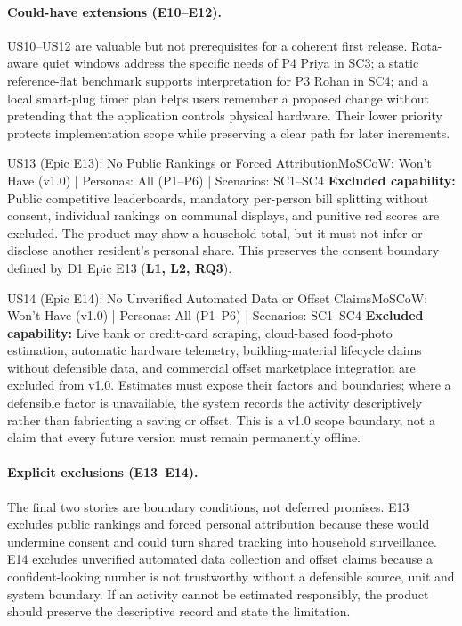 \documentclass[12pt,a4paper]{article}
\begin{document}
\paragraph{Could-have extensions (E10--E12).}
US10--US12 are valuable but not prerequisites for a coherent first release. Rota-aware quiet windows address the specific needs of P4 Priya in SC3; a static reference-flat benchmark supports interpretation for P3 Rohan in SC4; and a local smart-plug timer plan helps users remember a proposed change without pretending that the application controls physical hardware. Their lower priority protects implementation scope while preserving a clear path for later increments.

\begin{storybox}{US13 (Epic E13): No Public Rankings or Forced Attribution}{MoSCoW: Won't Have (v1.0) | Personas: All (P1--P6) | Scenarios: SC1--SC4}
\textbf{Excluded capability:} Public competitive leaderboards, mandatory per-person bill splitting without consent, individual rankings on communal displays, and punitive red scores are excluded. The product may show a household total, but it must not infer or disclose another resident's personal share. This preserves the consent boundary defined by D1 Epic E13 (\textbf{L1, L2, RQ3}).
\end{storybox}

\begin{storybox}{US14 (Epic E14): No Unverified Automated Data or Offset Claims}{MoSCoW: Won't Have (v1.0) | Personas: All (P1--P6) | Scenarios: SC1--SC4}
\textbf{Excluded capability:} Live bank or credit-card scraping, cloud-based food-photo estimation, automatic hardware telemetry, building-material lifecycle claims without defensible data, and commercial offset marketplace integration are excluded from v1.0. Estimates must expose their factors and boundaries; where a defensible factor is unavailable, the system records the activity descriptively rather than fabricating a saving or offset. This is a v1.0 scope boundary, not a claim that every future version must remain permanently offline.
\end{storybox}

\paragraph{Explicit exclusions (E13--E14).}
The final two stories are boundary conditions, not deferred promises. E13 excludes public rankings and forced personal attribution because these would undermine consent and could turn shared tracking into household surveillance. E14 excludes unverified automated data collection and offset claims because a confident-looking number is not trustworthy without a defensible source, unit and system boundary. If an activity cannot be estimated responsibly, the product should preserve the descriptive record and state the limitation.
\end{document}
